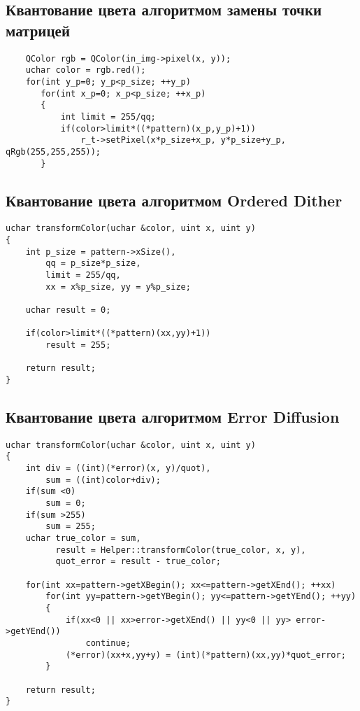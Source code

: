 \subsection{Квантование цвета алгоритмом замены точки матрицей}
\begin{lstlisting}
    QColor rgb = QColor(in_img->pixel(x, y));
    uchar color = rgb.red();
    for(int y_p=0; y_p<p_size; ++y_p)
       for(int x_p=0; x_p<p_size; ++x_p)
       {
           int limit = 255/qq;
           if(color>limit*((*pattern)(x_p,y_p)+1))
               r_t->setPixel(x*p_size+x_p, y*p_size+y_p, qRgb(255,255,255));
       }
\end{lstlisting}

\subsection{Квантование цвета алгоритмом Ordered Dither}
\begin{lstlisting}
uchar transformColor(uchar &color, uint x, uint y)
{
    int p_size = pattern->xSize(),
        qq = p_size*p_size,
        limit = 255/qq,
        xx = x%p_size, yy = y%p_size;

    uchar result = 0;

    if(color>limit*((*pattern)(xx,yy)+1))
        result = 255;

    return result;
}

\end{lstlisting}

\subsection{Квантование цвета алгоритмом Error Diffusion}
\begin{lstlisting}
uchar transformColor(uchar &color, uint x, uint y)
{
    int div = ((int)(*error)(x, y)/quot),
        sum = ((int)color+div);
    if(sum <0)
        sum = 0;
    if(sum >255)
        sum = 255;
    uchar true_color = sum,
          result = Helper::transformColor(true_color, x, y),
          quot_error = result - true_color;

    for(int xx=pattern->getXBegin(); xx<=pattern->getXEnd(); ++xx)
        for(int yy=pattern->getYBegin(); yy<=pattern->getYEnd(); ++yy)
        {
            if(xx<0 || xx>error->getXEnd() || yy<0 || yy> error->getYEnd())
                continue;
            (*error)(xx+x,yy+y) = (int)(*pattern)(xx,yy)*quot_error;
        }

    return result;
}
\end{lstlisting}

